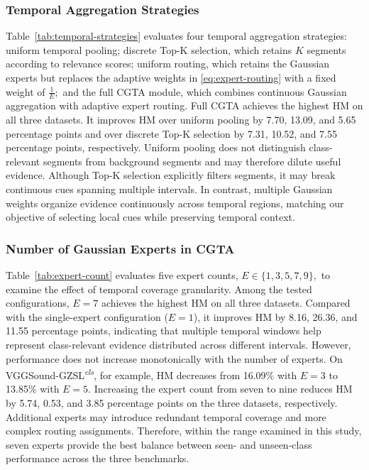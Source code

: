 \subsubsection{Temporal Aggregation Strategies}\label{sec:temporal-aggregation-strategies}


Table~\ref{tab:temporal-strategies} evaluates four temporal aggregation strategies: uniform temporal pooling; discrete Top-K selection, which retains $K$ segments according to relevance scores; uniform routing, which retains the Gaussian experts but replaces the adaptive weights in \eqref{eq:expert-routing} with a fixed weight of $\frac{1}{E};$ and the full CGTA module, which combines continuous Gaussian aggregation with adaptive expert routing. Full CGTA achieves the highest HM on all three datasets. It improves HM over uniform pooling by 7.70, 13.09, and 5.65 percentage points and over discrete Top-K selection by 7.31, 10.52, and 7.55 percentage points, respectively. Uniform pooling does not distinguish class-relevant segments from background segments and may therefore dilute useful evidence. Although Top-K selection explicitly filters segments, it may break continuous cues spanning multiple intervals. In contrast, multiple Gaussian weights organize evidence continuously across temporal regions, matching our objective of selecting local cues while preserving temporal context.

\subsubsection{Number of Gaussian Experts in CGTA}\label{sec:number-of-gaussian-experts-in-cgta}


Table~\ref{tab:expert-count} evaluates five expert counts, $E\in \{1,3,5,7,9\},$ to examine the effect of temporal coverage granularity. Among the tested configurations, $E=7$ achieves the highest HM on all three datasets. Compared with the single-expert configuration ($E=1$), it improves HM by 8.16, 26.36, and 11.55 percentage points, indicating that multiple temporal windows help represent class-relevant evidence distributed across different intervals. However, performance does not increase monotonically with the number of experts. On VGGSound-GZSL\textsuperscript{\textit{cls}}, for example, HM decreases from 16.09\% with $E=3$ to 13.85\% with $E=5.$ Increasing the expert count from seven to nine reduces HM by 5.74, 0.53, and 3.85 percentage points on the three datasets, respectively. Additional experts may introduce redundant temporal coverage and more complex routing assignments. Therefore, within the range examined in this study, seven experts provide the best balance between seen- and unseen-class performance across the three benchmarks.

